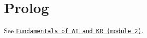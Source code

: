 \chapter{Prolog}

See \href{https://github.com/NotXia/unibo-ai-notes/tree/pdfs/fundamentals-of-ai-and-kr/module2}{\texttt{Fundamentals of AI and KR (module 2)}}.